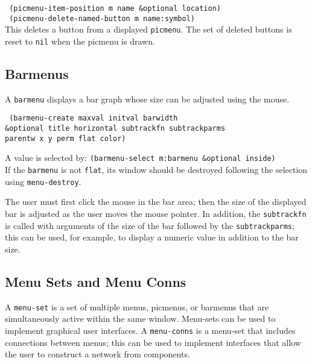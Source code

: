 {\tt \hspace*{0.5in} (picmenu-item-position m name \&optional location)} \\

\vspace{-0.1in}
{\tt \hspace*{0.5in} (picmenu-delete-named-button m name:symbol)} \\
This deletes a button from a displayed {\tt picmenu}.  The set of
deleted buttons is reset to {\tt nil} when the picmenu is drawn.

\subsection{Barmenus}

A {\tt barmenu} displays a bar graph whose size can be adjusted using
the mouse.

{\tt \hspace*{0.5in} 
(barmenu-create maxval initval barwidth \\
\hspace*{1.5in} \&optional title horizontal subtrackfn subtrackparms \\
\hspace*{1.5in} parentw x y perm flat color)}

A value is selected by: {\tt (barmenu-select m:barmenu \&optional inside)} \\
If the {\tt barmenu} is not {\tt flat}, its window should be destroyed
following the selection using {\tt menu-destroy}.

The user must first click the mouse in the bar area; then
the size of the displayed bar is adjusted as the user moves the mouse
pointer.  In addition, the {\tt subtrackfn} is called with arguments
of the size of the bar followed by the {\tt subtrackparms}; this can
be used, for example, to display a numeric value in addition to the
bar size.


\subsection{Menu Sets and Menu Conns}

A {\tt menu-set} is a set of multiple menus, picmenus, or barmenus
that are simultaneously active within the same window.  Menu-sets
can be used to implement graphical user interfaces.  A {\tt menu-conns}
is a menu-set that includes connections between menus; this can be
used to implement interfaces that allow the user to construct a network
from components.

